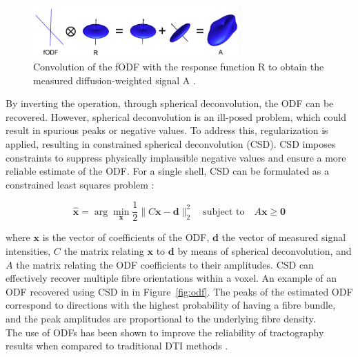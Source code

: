 \begin{figure}[h]
  \centering
  \includegraphics[width=0.7\textwidth]{Images/convolution.png} %
  \caption{Convolution of the fODF with the response function R to obtain the measured diffusion-weighted signal A \cite{Seunarine2013}.}
  \label{fig:convolution}
\end{figure}

By inverting the operation, through spherical deconvolution, the ODF can be recovered. However, spherical deconvolution is an ill-posed problem, which could result in spurious peaks or negative values. To address this, regularization is applied, resulting in constrained spherical deconvolution (CSD). CSD imposes constraints to suppress physically implausible negative values and ensure a more reliable estimate of the ODF. For a single shell, CSD can be formulated as a constrained least squares problem \cite{Jeurissen2014}:

\begin{equation}
\hat{\boldsymbol{x}} = \arg\min_{\boldsymbol{x}} \frac{1}{2} \| C\boldsymbol{x} - \boldsymbol{d} \|_2^2 \quad \text{subject to} \quad A\boldsymbol{x} \geq \boldsymbol{0}
\label{eq:CSD}
\end{equation}

where $\boldsymbol{x}$ is the vector of coefficients of the ODF, $\boldsymbol{d}$ the vector of measured signal intensities, $C$ the matrix relating $\boldsymbol{x}$ to $\boldsymbol{d}$ by means of spherical deconvolution, and $A$ the matrix relating the ODF coefficients to their amplitudes.
CSD can effectively recover multiple fibre orientations within a voxel. An example of an ODF recovered using CSD in in Figure~\ref{fig:odf}. The peaks of the estimated ODF correspond to directions with the highest probability of having a fibre bundle, and the peak amplitudes are proportional to the underlying fibre density.
\\The use of ODFs has been shown to improve the reliability of tractography results when compared to traditional DTI methods \cite{Jeurissen2011}.

